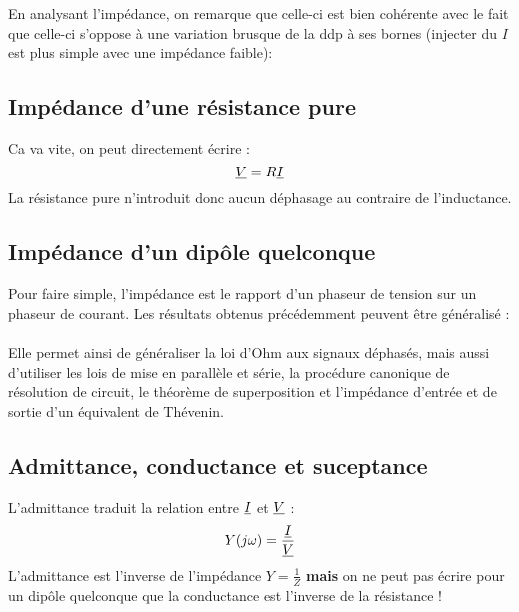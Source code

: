 \documentclass[11pt, a4paper, openany]{book}
\begin{document}
		En analysant l'impédance, on remarque que celle-ci est bien cohérente avec le fait que celle-ci s'oppose à une variation brusque de la ddp à ses bornes (injecter du $I$ est plus simple avec une impédance faible):\\
		
		
		\subsection{Impédance d'une résistance pure}
		Ca va vite, on peut directement écrire :
		\begin{equation}
		\phas{V} = R\phas{I}
		\end{equation}
		La résistance pure n'introduit donc aucun déphasage au contraire de l'inductance.
		
		\subsection{Impédance d'un dipôle quelconque}
		Pour faire simple, l'impédance est le rapport d'un phaseur de tension sur un phaseur de courant. Les résultats obtenus  précédemment peuvent être généralisé :\\
		
		\ \\
		
		Elle permet ainsi de généraliser la loi d'Ohm aux signaux déphasés, mais aussi d'utiliser les lois de mise en parallèle et série, la procédure canonique de résolution de circuit, le théorème de superposition et l'impédance d'entrée et de sortie d'un équivalent de Thévenin.
		
		\subsection{Admittance, conductance et suceptance}
		L'admittance traduit la relation entre $\phas{I}$ et $\phas{V}$ :
		\begin{equation}
		Y(j\omega) = \frac{\phas{I}}{\phas{V}}
		\end{equation}
		L'admittance est l'inverse de l'impédance $Y = \frac{1}{Z}$ \textbf{mais} on ne peut pas écrire pour un dipôle quelconque que la conductance est l'inverse de la résistance !
		
\end{document}
